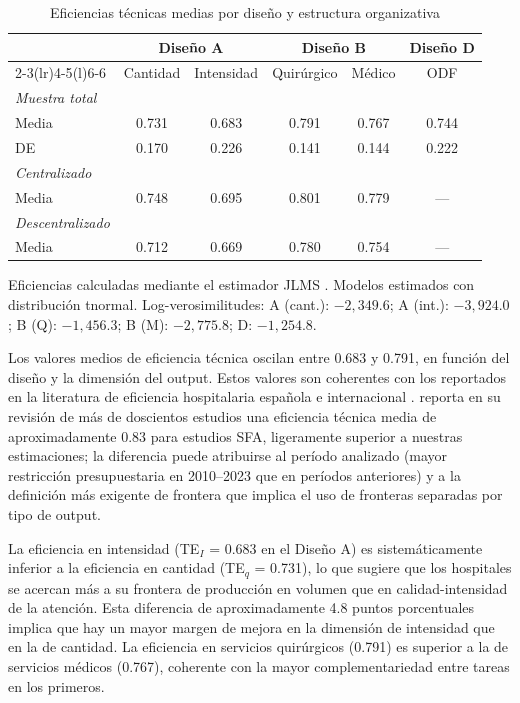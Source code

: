 \documentclass[12pt, a4paper, twoside, openright]{book}
\theoremstyle{plain}
\theoremstyle{definition}
\theoremstyle{remark}
\begin{document}
\begin{table}[htbp]
\centering
\caption{Eficiencias técnicas medias por diseño y estructura organizativa}
\label{tab:te_medias}
\begin{threeparttable}
\begin{tabular}{lccccc}
\toprule
& \multicolumn{2}{c}{\textbf{Diseño A}} &
  \multicolumn{2}{c}{\textbf{Diseño B}} &
  \textbf{Diseño D} \\
\cmidrule(lr){2-3}\cmidrule(lr){4-5}\cmidrule(l){6-6}
& Cantidad & Intensidad & Quirúrgico & Médico & ODF \\
\midrule
\textit{Muestra total} \\
\quad Media & 0.731 & 0.683 & 0.791 & 0.767 & 0.744 \\
\quad DE & 0.170 & 0.226 & 0.141 & 0.144 & 0.222 \\[4pt]
\textit{Centralizado} \\
\quad Media & 0.748 & 0.695 & 0.801 & 0.779 & --- \\[4pt]
\textit{Descentralizado} \\
\quad Media & 0.712 & 0.669 & 0.780 & 0.754 & --- \\
\bottomrule
\end{tabular}
\begin{tablenotes}
  \small
  \item Eficiencias calculadas mediante el estimador JLMS \citep{jondrow1982}. Modelos estimados con distribución tnormal. Log-verosimilitudes: A (cant.): $-2{,}349.6$; A (int.): $-3{,}924.0$; B (Q): $-1{,}456.3$; B (M): $-2{,}775.8$; D: $-1{,}254.8$.
\end{tablenotes}
\end{threeparttable}
\end{table}

Los valores medios de eficiencia técnica oscilan entre 0.683 y 0.791, en función del diseño y la dimensión del output. Estos valores son coherentes con los reportados en la literatura de eficiencia hospitalaria española \citep{puigjunoy2000} e internacional \citep{hollingsworth2008,rosko2008}. \citet{hollingsworth2008} reporta en su revisión de más de doscientos estudios una eficiencia técnica media de aproximadamente 0.83 para estudios SFA, ligeramente superior a nuestras estimaciones; la diferencia puede atribuirse al período analizado (mayor restricción presupuestaria en 2010--2023 que en períodos anteriores) y a la definición más exigente de frontera que implica el uso de fronteras separadas por tipo de output.

La eficiencia en intensidad (TE$_I$ = 0.683 en el Diseño A) es sistemáticamente inferior a la eficiencia en cantidad (TE$_q$ = 0.731), lo que sugiere que los hospitales se acercan más a su frontera de producción en volumen que en calidad-intensidad de la atención. Esta diferencia de aproximadamente 4.8 puntos porcentuales implica que hay un mayor margen de mejora en la dimensión de intensidad que en la de cantidad. La eficiencia en servicios quirúrgicos (0.791) es superior a la de servicios médicos (0.767), coherente con la mayor complementariedad entre tareas en los primeros.
\end{document}

